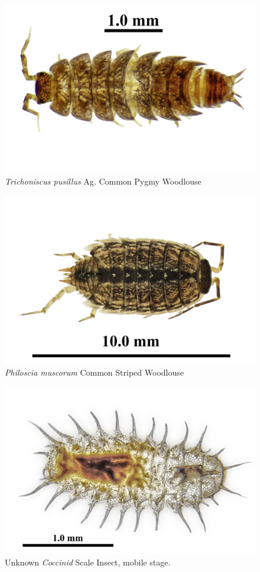 \documentclass[
]{article}
\begin{document}
\begin{figure}

{\centering \includegraphics[width=0.8\linewidth]{images/TrichoniscusPusillus} 

}

\caption{  \textit{Trichoniscus pusillus} Ag. Common Pygmy Woodlouse}\label{fig:TrichoniscusPusillus}
\end{figure}

\begin{figure}

{\centering \includegraphics[width=0.8\linewidth]{images/PhilosciaMuscorum} 

}

\caption{\textit{Philoscia muscorum} Common Striped Woodlouse}\label{fig:PhilosciaMuscorum}
\end{figure}

\begin{figure}

{\centering \includegraphics[width=0.8\linewidth]{images/Coccinid} 

}

\caption{Unknown \textit{Coccinid} Scale Insect, mobile stage.}\label{fig:Coccinid}
\end{figure}
\end{document}
